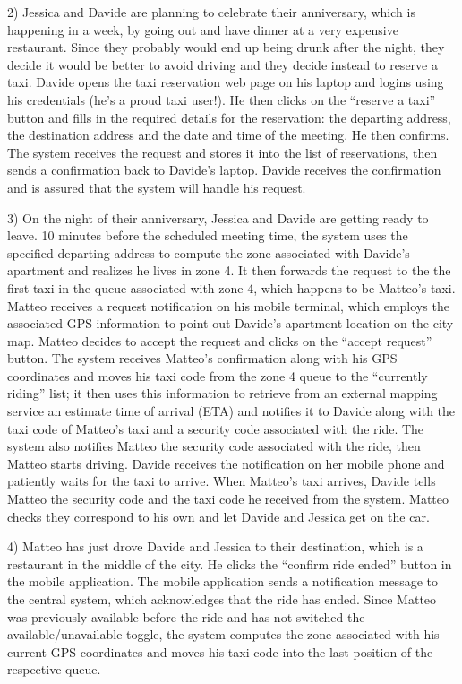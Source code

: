 \documentclass{book}
\begin{document}
2) Jessica and Davide are planning to celebrate their anniversary, which is happening in a week, by going out and have dinner at a very expensive restaurant. 
Since they probably would end up being drunk after the night, they decide it would be better to avoid driving and they decide instead to reserve a taxi.
Davide opens the taxi reservation web page on his laptop and logins using his credentials (he’s a proud taxi user!). He then clicks on the “reserve a taxi” button and fills in the required details for the reservation: the departing address, the destination address and the date and time of the meeting. He then confirms.
The system receives the request and stores it into the list of reservations, then sends a confirmation back to Davide’s laptop.
Davide receives the confirmation and is assured that the system will handle his request.

3) On the night of their anniversary, Jessica and Davide are getting ready to leave. 
10 minutes before the scheduled meeting time, the system uses the specified departing address to compute the zone associated with Davide’s apartment and realizes he lives in zone 4. It then forwards the request to the the first taxi in the queue associated with zone 4, which happens to be Matteo’s taxi.
Matteo receives a request notification on his mobile terminal, which employs the associated GPS information to point out Davide’s apartment location on the city map. Matteo decides to accept the request and clicks on the “accept request” button.
The system receives Matteo’s confirmation along with his GPS coordinates and moves his taxi code from the zone 4 queue to the “currently riding” list; it then uses this information to retrieve from an external mapping service an estimate time of arrival (ETA) and notifies it to Davide along with the taxi code of Matteo’s taxi and a security code associated with the ride. The system also notifies Matteo the security code associated with the ride, then Matteo starts driving.
Davide receives the notification on her mobile phone and patiently waits for the taxi to arrive.
When Matteo’s taxi arrives, Davide tells Matteo the security code and the taxi code he received from the system. Matteo checks they correspond to his own and let Davide and Jessica get on the car.

4) Matteo has just drove Davide and Jessica to their destination, which is a restaurant in the middle of the city. He clicks the “confirm ride ended” button in the mobile application. The mobile application sends a notification message to the central system, which acknowledges that the ride has ended. 
Since Matteo was previously available before the ride and has not switched the available/unavailable toggle, the system computes the zone associated with his current GPS coordinates and moves his taxi code into the last position of the respective queue.
\end{document}
